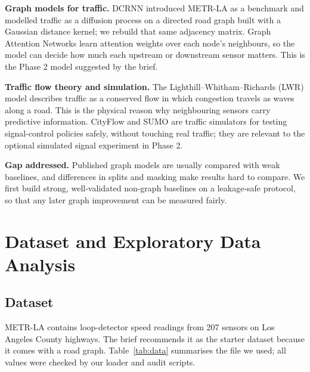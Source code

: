 \documentclass[conference]{IEEEtran}
\begin{document}
\textbf{Graph models for traffic.} DCRNN \cite{li} introduced METR-LA as a benchmark and modelled traffic as a diffusion process on a directed road graph built with a Gaussian distance kernel; we rebuild that same adjacency matrix. Graph Attention Networks \cite{gat} learn attention weights over each node's neighbours, so the model can decide how much each upstream or downstream sensor matters. This is the Phase 2 model suggested by the brief.

\textbf{Traffic flow theory and simulation.} The Lighthill--Whitham--Richards (LWR) model \cite{lighthill,richards} describes traffic as a conserved flow in which congestion travels as waves along a road. This is the physical reason why neighbouring sensors carry predictive information. CityFlow \cite{cityflow} and SUMO \cite{sumo} are traffic simulators for testing signal-control policies safely, without touching real traffic; they are relevant to the optional simulated signal experiment in Phase 2.

\textbf{Gap addressed.} Published graph models are usually compared with weak baselines, and differences in splits and masking make results hard to compare. We first build strong, well-validated non-graph baselines on a leakage-safe protocol, so that any later graph improvement can be measured fairly.

\section{Dataset and Exploratory Data Analysis}
\label{sec:data}
\subsection{Dataset}
METR-LA \cite{li} contains loop-detector speed readings from 207 sensors on Los Angeles County highways. The brief recommends it as the starter dataset because it comes with a road graph. Table~\ref{tab:data} summarises the file we used; all values were checked by our loader and audit scripts.
\end{document}

